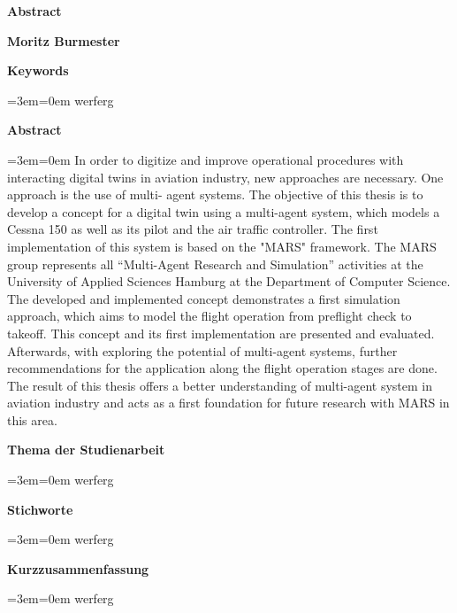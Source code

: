 \newenvironment{blockquote}{%
  \par%
  \leftskip=3em\rightskip=0em%
  \noindent\ignorespaces}{%
  \par\medskip}


{\LARGE\bfseries\raggedleft Abstract}
\bigskip
\normalsize


    
{\bfseries\raggedleft Moritz Burmester}

\bigskip

{\bfseries\raggedleft Keywords}
\begin{blockquote}
werferg
\end{blockquote}

{\bfseries\raggedleft Abstract}
\begin{blockquote}
In order to digitize and improve operational procedures with interacting digital twins in
aviation industry, new approaches are necessary. One approach is the use of multi-
agent systems. The objective of this thesis is to develop a concept for a digital twin using
a multi-agent system, which models a Cessna 150 as well as its pilot and the air traffic
controller. The first implementation of this system is based on the "MARS" framework.
The MARS group represents all “Multi-Agent Research and Simulation” activities at the
University of Applied Sciences Hamburg at the Department of Computer Science. The
developed and implemented concept demonstrates a first simulation approach, which
aims to model the flight operation from preflight check to takeoff. This concept and its
first implementation are presented and evaluated. Afterwards, with exploring the
potential of multi-agent systems, further recommendations for the application along the
flight operation stages are done. The result of this thesis offers a better understanding of
multi-agent system in aviation industry and acts as a first foundation for future research
with MARS in this area.
\end{blockquote}

\bigskip\bigskip

{\bfseries\raggedleft Thema der Studienarbeit}
\begin{blockquote}
werferg
\end{blockquote}

{\bfseries\raggedleft Stichworte}
\begin{blockquote}
werferg
\end{blockquote}

{\bfseries\raggedleft Kurzzusammenfassung}
\begin{blockquote}
werferg
\end{blockquote}

